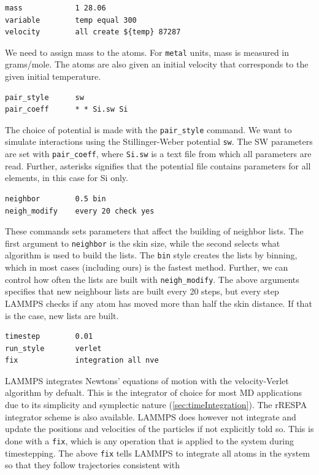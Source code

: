 \documentclass[twoside,english]{uiofysmaster}
\begin{document}
\begin{lstlisting}[style=lammps]
mass			1 28.06
variable		temp equal 300
velocity		all create ${temp} 87287 
\end{lstlisting}
We need to assign mass to the atoms. For \texttt{metal} units, 
mass is measured in grams/mole. The atoms are also
given an initial velocity that corresponds to 
the given initial temperature. 
\begin{lstlisting}[style=lammps]
pair_style		sw
pair_coeff		* * Si.sw Si
\end{lstlisting}
The choice of potential is made with the 
\texttt{pair\_style} command. We want to simulate
interactions using the Stillinger-Weber potential \texttt{sw}. The SW parameters
are set with \texttt{pair\_coeff}, where \texttt{Si.sw} is a text file from which all parameters are read.  
Further, asterisks signifies that the potential file contains parameters for all elements, in this case for 
Si only. 
\begin{lstlisting}[style=lammps]
neighbor		0.5 bin
neigh_modify	every 20 check yes
\end{lstlisting}
These commands sets parameters that affect the 
building of neighbor lists. The first argument
to \texttt{neighbor} is the skin size, while the 
second selects what algorithm is used
to build the lists. The \texttt{bin} style creates 
the lists by binning, which in most cases
(including ours) is the fastest method. 
Further, we can control how often the lists
are built with \texttt{neigh\_modify}. The above arguments
specifies that new neighbour lists are built 
every 20 steps, but every step LAMMPS checks
if any atom has moved more than half the skin distance.
If that is the case, new lists are built. 
\begin{lstlisting}[style=lammps]
timestep 		0.01
run_style 		verlet
fix 			integration all nve
\end{lstlisting}
LAMMPS integrates Newtons' equations of motion
with the velocity-Verlet algorithm by defualt. 
This is the integrator of choice for most MD
applications due to its simplicity and 
symplectic nature (\autoref{sec:timeIntegration}). The 
rRESPA integrator \cite{Tuckerman92} scheme is also available.
LAMMPS does however not integrate and update
the positions and velocities of the particles
if not explicitly told so. This is done with
a \texttt{fix}, which is any operation that is applied to the 
system during timestepping. The above \texttt{fix} 
tells LAMMPS to integrate all atoms in the system 
so that they follow trajectories consistent with 
\end{document}
